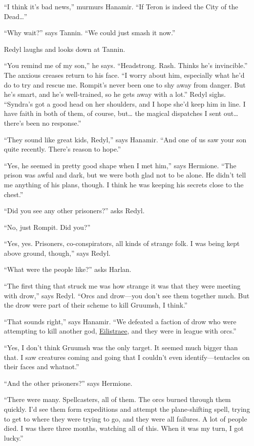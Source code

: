 \documentclass[smalldemyvopaper,11pt,twoside,onecolumn,openright,extrafontsizes]{memoir}
\begin{document}
``I think it's bad news,'' murmurs Hanamir. ``If Teron is indeed the
City of the Dead\ldots{}''

``Why wait?'' says Tannin. ``We could just smash it now.''

Redyl laughs and looks down at Tannin.

``You remind me of my son,'' he says. ``Headstrong. Rash. Thinks he's
invincible.'' The anxious creases return to his face. ``I worry about
him, especially what he'd do to try and rescue me. Rompit's never been
one to shy away from danger. But he's smart, and he's well-trained, so
he gets away with a lot.'' Redyl sighs. ``Syndra's got a good head on
her shoulders, and I hope she'd keep him in line. I have faith in both
of them, of course, but\ldots{} the magical dispatches I sent
out\ldots{} there's been no response.''

``They sound like great kids, Redyl,'' says Hanamir. ``And one of us saw
your son quite recently. There's reason to hope.''

``Yes, he seemed in pretty good shape when I met him,'' says Hermione.
``The prison was awful and dark, but we were both glad not to be alone.
He didn't tell me anything of his plans, though. I think he was keeping
his secrets close to the chest.''

``Did you see any other prisoners?'' asks Redyl.

``No, just Rompit. Did you?''

``Yes, yes. Prisoners, co-conspirators, all kinds of strange folk. I was
being kept above ground, though,'' says Redyl.

``What were the people like?'' asks Harlan.

``The first thing that struck me was how strange it was that they were
meeting with drow,'' says Redyl. ``Orcs and drow---you don't see them
together much. But the drow were part of their scheme to kill Gruumsh, I
think.''

``That sounds right,'' says Hanamir. ``We defeated a faction of drow who
were attempting to kill another god,
\href{/characters/eilistraee/}{Eilistraee}, and they were in league with
orcs.''

``Yes, I don't think Gruumsh was the only target. It seemed much bigger
than that. I saw creatures coming and going that I couldn't even
identify---tentacles on their faces and whatnot.''

``And the other prisoners?'' says Hermione.

``There were many. Spellcasters, all of them. The orcs burned through
them quickly. I'd see them form expeditions and attempt the
plane-shifting spell, trying to get to where they were trying to go, and
they were all failures. A lot of people died. I was there three months,
watching all of this. When it was my turn, I got lucky.''
\end{document}
